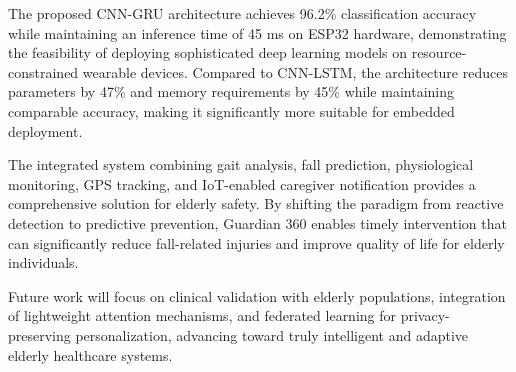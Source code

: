 \documentclass[conference]{IEEEtran}
\begin{document}
The proposed CNN-GRU architecture achieves 96.2\% classification accuracy while maintaining an inference time of 45 ms on ESP32 hardware, demonstrating the feasibility of deploying sophisticated deep learning models on resource-constrained wearable devices. Compared to CNN-LSTM, the architecture reduces parameters by 47\% and memory requirements by 45\% while maintaining comparable accuracy, making it significantly more suitable for embedded deployment.

The integrated system combining gait analysis, fall prediction, physiological monitoring, GPS tracking, and IoT-enabled caregiver notification provides a comprehensive solution for elderly safety. By shifting the paradigm from reactive detection to predictive prevention, Guardian 360 enables timely intervention that can significantly reduce fall-related injuries and improve quality of life for elderly individuals.

Future work will focus on clinical validation with elderly populations, integration of lightweight attention mechanisms, and federated learning for privacy-preserving personalization, advancing toward truly intelligent and adaptive elderly healthcare systems.
\end{document}
